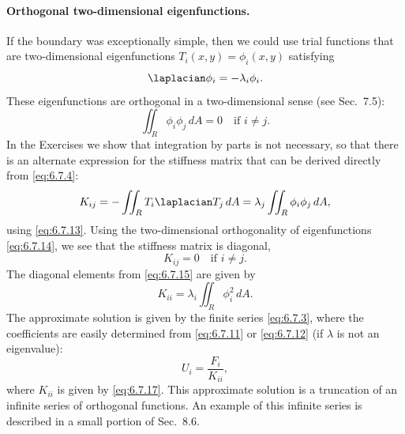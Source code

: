 \paragraph{Orthogonal two-dimensional eigenfunctions.}
If the boundary was exceptionally simple, then we could use trial functions that are two-dimensional eigenfunctions $T_i(x,y) = \phi_i(x,y)$ satisfying
\begin{equation}
\laplacian\phi_i = -\lambda_i\phi_i.
\label{eq:6.7.13}
\end{equation}
These eigenfunctions are orthogonal in a two-dimensional sense (see Sec.~7.5):
\begin{equation}
\iint_R \phi_i\phi_j\,dA = 0 \quad\text{if } i \ne j.
\label{eq:6.7.14}
\end{equation}
In the Exercises we show that integration by parts is not necessary, so that there is an alternate expression for the stiffness matrix that can be derived directly from \eqref{eq:6.7.4}:
\begin{equation}
K_{ij} = -\iint_R T_i\laplacian T_j\,dA = \lambda_j \iint_R \phi_i\phi_j\,dA,
\label{eq:6.7.15}
\end{equation}
using \eqref{eq:6.7.13}.  Using the two-dimensional orthogonality of eigenfunctions \eqref{eq:6.7.14}, we see that the stiffness matrix is diagonal,
\begin{equation}
K_{ij} = 0 \quad\text{if } i \ne j.
\label{eq:6.7.16}
\end{equation}
The diagonal elements from \eqref{eq:6.7.15} are given by
\begin{equation}
K_{ii} = \lambda_i\iint_R \phi_i^2\,dA.
\label{eq:6.7.17}
\end{equation}
The approximate solution is given by the finite series \eqref{eq:6.7.3}, where the coefficients are easily determined from \eqref{eq:6.7.11} or \eqref{eq:6.7.12} (if $\lambda$ is not an eigenvalue):
\begin{equation}
U_i = \frac{F_i}{K_{ii}},
\label{eq:6.7.18}
\end{equation}
where $K_{ii}$ is given by \eqref{eq:6.7.17}.  This approximate solution is a truncation of an infinite series of orthogonal functions.  An example of this infinite series is described in a small portion of Sec.~8.6.

